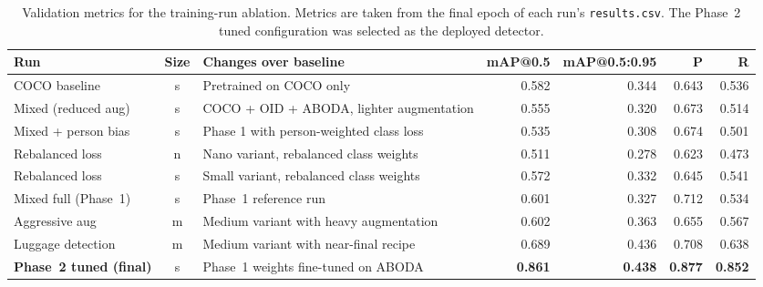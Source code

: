 \begin{table}[!htbp]
	\centering
	\small
	\begin{tabularx}{\textwidth}{@{\extracolsep{\fill}}>{\raggedright\arraybackslash}X c >{\raggedright\arraybackslash}X r r r r}
		\toprule
		\textbf{Run}                   & \textbf{Size} & \textbf{Changes over baseline}           & \textbf{mAP@0.5} & \textbf{mAP@0.5:0.95} & \textbf{P}     & \textbf{R}     \\
		\midrule
		COCO baseline                  & s             & Pretrained on COCO only                  & 0.582            & 0.344                 & 0.643          & 0.536          \\
		Mixed (reduced aug)            & s             & COCO + OID + ABODA, lighter augmentation & 0.555            & 0.320                 & 0.673          & 0.514          \\
		Mixed + person bias            & s             & Phase 1 with person-weighted class loss  & 0.535            & 0.308                 & 0.674          & 0.501          \\
		Rebalanced loss                & n             & Nano variant, rebalanced class weights   & 0.511            & 0.278                 & 0.623          & 0.473          \\
		Rebalanced loss                & s             & Small variant, rebalanced class weights  & 0.572            & 0.332                 & 0.645          & 0.541          \\
		Mixed full (Phase~1)           & s             & Phase~1 reference run                    & 0.601            & 0.327                 & 0.712          & 0.534          \\
		Aggressive aug                 & m             & Medium variant with heavy augmentation   & 0.602            & 0.363                 & 0.655          & 0.567          \\
		Luggage detection              & m             & Medium variant with near-final recipe    & 0.689            & 0.436                 & 0.708          & 0.638          \\
		\textbf{Phase~2 tuned (final)} & s             & Phase~1 weights fine-tuned on ABODA      & \textbf{0.861}   & \textbf{0.438}        & \textbf{0.877} & \textbf{0.852} \\
		\bottomrule
	\end{tabularx}
	\caption{Validation metrics for the training-run ablation. Metrics are taken from the final epoch of each run's \texttt{results.csv}. The Phase~2 tuned configuration was selected as the deployed detector.}
	\label{tab:training_ablation}
\end{table}

